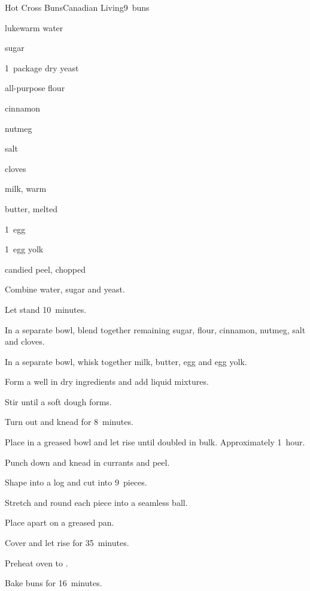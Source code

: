 \begin{recipe}{Hot Cross Buns}{Canadian Living}{9~buns}

\begin{ingredients}
\item \C{\quarter} lukewarm water
\item \C{\half} sugar
\item 1~package dry yeast
\item \C{3\half} all-purpose flour
\item {} cinnamon
\item {} nutmeg
\item \tp{\half} salt
\item \tp{\quarter} cloves
\item \C{\threequarter} milk, warm
\item \C{\quarter} butter, melted
\item 1~egg
\item 1~egg yolk
\item \C{\half} 
\item \C{\quarter} candied peel, chopped
\end{ingredients}

\begin{directions}
\item Combine water,  sugar and yeast.
\item Let stand 10~minutes.
\item In a separate bowl, blend together remaining sugar, flour, cinnamon, nutmeg, salt and cloves.
\item In a separate bowl, whisk together milk, butter, egg and egg yolk.
\item Form a well in dry ingredients and add liquid mixtures.
\item Stir until a soft dough forms.
\item Turn out and knead for 8~minutes.
\item Place in a greased bowl and let rise until doubled in bulk. Approximately 1~hour.
\item Punch down and knead in currants and peel.
\item Shape into a  log and cut into 9~pieces.
\item Stretch and round each piece into a seamless ball.
\item Place  apart on a greased pan.
\item Cover and let rise for 35~minutes.
\item Preheat oven to .
\item Bake buns for 16~minutes.
\end{directions}


\end{recipe}
